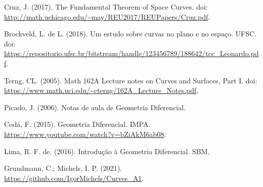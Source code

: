 \documentclass{article}
\begin{document}
\begin{thebibliography}{9}

 Cruz, J. (2017). The Fundamental Theorem of Space Curves. doi: \url{http://math.uchicago.edu/~may/REU2017/REUPapers/Cruz.pdf}.

 Brockveld, L. de L. (2018). Um estudo sobre curvas no plano e no espaço. UFSC. doi: \url{https://repositorio.ufsc.br/bitstream/handle/123456789/188642/tcc_Leonardo.pdf}.

 Terng, CL. (2005). Math 162A Lecture notes on Curves and Surfaces, Part I. doi: \url{https://www.math.uci.edu/~cterng/162A_Lecture_Notes.pdf}.

 Picado, J. (2006). Notas de aula de Geometria Diferencial.

 Codá, F. (2015). Geometria Diferencial. IMPA. \url{https://www.youtube.com/watch?v=bZiAkM6ab08}.

 Lima, R. F. de. (2016). Introdução à Geometria Diferencial. SBM.

 Grundmann, C.; Michels, I. P. (2021). \url{https://github.com/IgorMichels/Curves_A1}.

\end{thebibliography}
\end{document}
